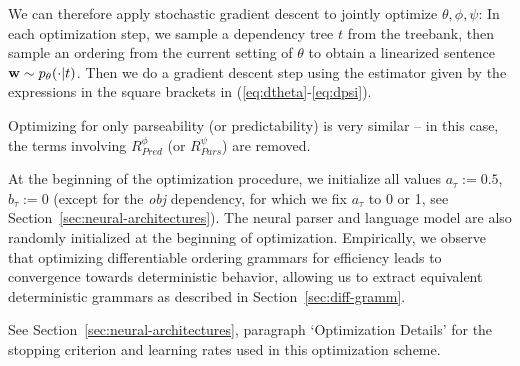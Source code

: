 \documentclass[10pt,twoside,lineno]{article}
\DeclareMathOperator{\E}{\mathop{\mathbb{E}}}
\begin{document}
We can therefore apply stochastic gradient descent to jointly optimize $\theta, \phi, \psi$:
In each optimization step, we sample a dependency tree $t$ from the treebank, then sample an ordering from the current setting of $\theta$ to obtain a linearized sentence ${\bf w} \sim p_{\theta}(\cdot|t)$.
Then we %
do a gradient descent step using the estimator given by the expressions in the square brackets in (\ref{eq:dtheta}-\ref{eq:dpsi}).


Optimizing for only parseability (or predictability) is very similar -- in this case, the terms involving $R_{Pred}^\phi$ (or $R_{Pars}^\psi$) are removed.


At the beginning of the optimization procedure, we initialize all values $a_\tau := 0.5$, $b_\tau := 0$ (except for the \emph{obj} dependency, for which we fix $a_\tau$ to 0 or 1, see Section~\ref{sec:neural-architectures}).
The neural parser and language model are also randomly initialized at the beginning of optimization.
Empirically, we observe that optimizing differentiable ordering grammars for efficiency leads to convergence towards deterministic behavior, allowing us to extract equivalent deterministic grammars as described in Section~\ref{sec:diff-gramm}.

See Section~\ref{sec:neural-architectures}, paragraph `Optimization Details' for the stopping criterion and learning rates used in this optimization scheme.



%
%
\end{document}
